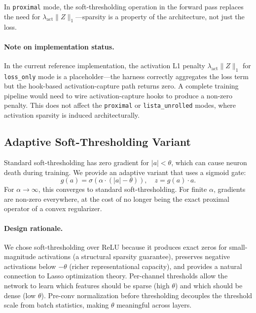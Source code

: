 \documentclass{article}
\begin{document}
In \texttt{proximal} mode, the soft-thresholding operation in the forward pass
replaces the need for $\lambda_{\text{act}} \|Z\|_1$---sparsity is a property
of the architecture, not just the loss.

\paragraph{Note on implementation status.}
In the current reference implementation, the activation L1 penalty
$\lambda_{\text{act}} \|Z\|_1$ for \texttt{loss\_only} mode is a
placeholder---the harness correctly aggregates the loss term but the hook-based
activation-capture path returns zero. A complete training pipeline would need
to wire activation-capture hooks to produce a non-zero penalty. This does not
affect the \texttt{proximal} or \texttt{lista\_unrolled} modes, where
activation sparsity is induced architecturally.

\subsection{Adaptive Soft-Thresholding Variant}

Standard soft-thresholding has zero gradient for $|a| < \theta$, which can
cause neuron death during training. We provide an adaptive variant that uses
a sigmoid gate:
\begin{equation}
    g(a) = \sigma(\alpha \cdot (|a| - \theta)), \quad
    z = g(a) \cdot a.
\end{equation}
For $\alpha \to \infty$, this converges to standard soft-thresholding. For
finite $\alpha$, gradients are non-zero everywhere, at the cost of no longer
being the exact proximal operator of a convex regularizer.

\paragraph{Design rationale.}
We chose soft-thresholding over ReLU because it produces exact zeros for
small-magnitude activations (a structural sparsity guarantee), preserves
negative activations below $-\theta$ (richer representational capacity), and
provides a natural connection to Lasso optimization theory. Per-channel
thresholds allow the network to learn which features should be sparse (high
$\theta$) and which should be dense (low $\theta$). Pre-conv normalization
before thresholding decouples the threshold scale from batch statistics,
making $\theta$ meaningful across layers.
\end{document}
